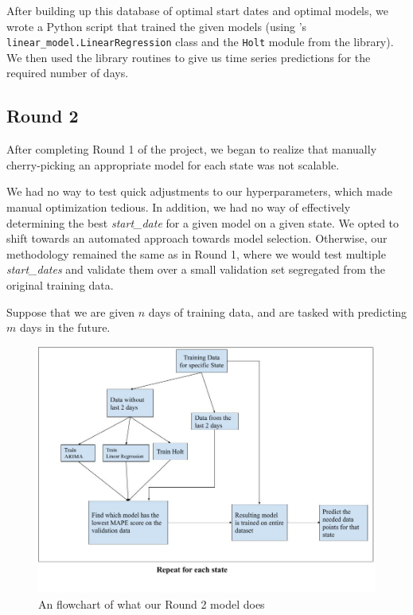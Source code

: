 \documentclass[sigconf,nonacm]{acmart}
\begin{document}
After building up this database of optimal start dates and optimal models, we
wrote a Python script that trained the given models (using \cite{scikit-learn}'s
\texttt{linear\_model.LinearRegression} class and the \texttt{Holt} module from
the \cite{statsmodels} library). We then used the library routines to give us
time series predictions for the required number of days. 

\subsection{Round 2}

After completing Round 1 of the project, we began to realize that manually
cherry-picking an appropriate model for each state was not scalable. 

We had no way to test quick adjustments to our hyperparameters, which made
manual optimization tedious. In addition, we had no way of effectively
determining the best \emph{start\_date} for a given model on a given state. 
We opted to shift towards an automated approach towards model selection. 
Otherwise, our methodology remained the same as in Round 1, where we would test
multiple \emph{start\_dates} and validate them over a small validation set segregated
from the original training data.

Suppose that we are given $n$ days of training data, and are tasked with
predicting $m$ days in the future. 

\begin{figure}
  \centering
  \includegraphics[width=\linewidth]{figures/Final_model.jpg}
  \caption{An flowchart of what our Round 2 model does}
  \label{fig:model_final}
\end{figure}
\end{document}
